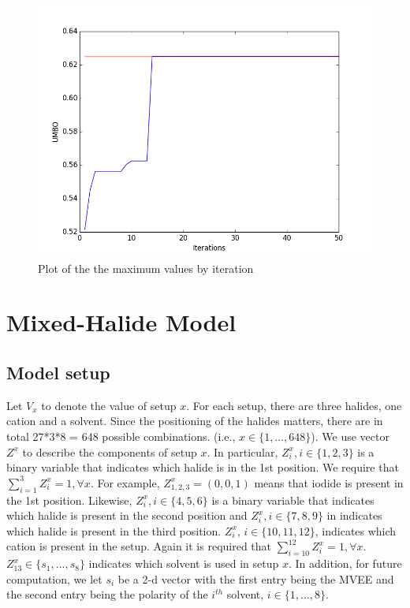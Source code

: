 \documentclass[11pt]{article}
\begin{document}
\begin{center}
\begin{figure}
\includegraphics[scale=.8]{plot_BO_process.png}
\caption{Plot of the the maximum values by iteration}
\label{plot_bo}
\end{figure}
\end{center}
\section{Mixed-Halide Model}
\subsection{Model setup}
Let $V_x$ to denote the value of setup $x$. For each setup, there are three halides, one cation and a solvent. Since the positioning of the halides matters, there are in total 27*3*8 = 648 possible combinations. (i.e., $x\in\{1,...,648\}$). We use vector $Z^x$ to describe the components of setup $x$. In particular, $Z^x_i, i\in\{1,2,3\}$ is a binary variable that indicates which halide is in the 1st position. We require that $\sum_{i=1}^3Z^x_i=1, \forall x$. For example, $Z^x_{1,2,3} = (0,0,1)$ means that iodide is present in the 1st position. Likewise, $Z^x_i, i\in\{4,5,6\}$ is a binary variable that indicates which halide is present in the second position and $Z^x_i, i\in\{7,8,9\}$ in indicates which halide is present in the third position. $Z^x_{i}$, $i\in\{10,11,12\}$, indicates which cation is present in the setup. Again it is required that $\sum_{i=10}^{12}Z^x_i=1, \forall x$. $Z_{13}^x \in \{s_1,...,s_8\}$ indicates which solvent is used in setup $x$. In addition, for future computation, we let $s_i$ be a 2-d vector with the first entry being the MVEE and the second entry being the polarity of the $i^{th}$ solvent, $i\in\{1,...,8\}$. 
\end{document}
